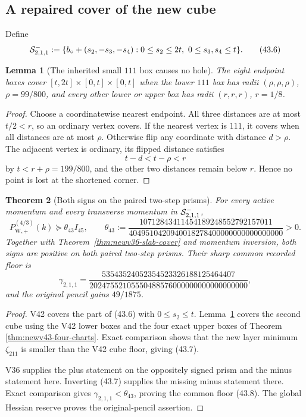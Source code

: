 \documentclass[11pt,oneside]{article}
\newtheorem{theorem}{Theorem}[section]
\newtheorem{lemma}[theorem]{Lemma}
\theoremstyle{definition}
\theoremstyle{remark}
\begin{document}
\subsection{A repaired cover of the new cube}

Define
\[
 {\cal S}_{2,1,1}^{-}:=
 \{b_\circ+(s_2,-s_3,-s_4):
       0\le s_2\le2t,\ 0\le s_3,s_4\le t\}.            \tag{43.6}
\]

\begin{lemma}[The inherited small \(111\) box causes no hole]
\label{lem:newv43-special-cover}
The eight endpoint boxes cover
\([t,2t]\times[0,t]\times[0,t]\) when the lower \(111\) box has
radii \((\rho,\rho,\rho)\), \(\rho=99/800\), and every other lower
or upper box has radii \((r,r,r)\), \(r=1/8\).
\end{lemma}

\begin{proof}
Choose a coordinatewise nearest endpoint.  All three distances are
at most \(t/2<r\), so an ordinary vertex covers.  If the nearest
vertex is \(111\), it covers when all distances are at most
\(\rho\).  Otherwise flip any coordinate with distance
\(d>\rho\).  The adjacent vertex is ordinary, its flipped distance
satisfies
\[
 t-d<t-\rho<r
\]
by \(t<r+\rho=199/800\), and the other two distances remain below
\(r\).  Hence no point is lost at the shortened corner.
\end{proof}

\begin{theorem}[Both signs on the paired two-step prisms]
\label{thm:newv43-paired-prisms}
For every active momentum and every transverse momentum in
\({\cal S}_{2,1,1}^{-}\),
\[
 P_{\mathrm W,+}^{(4/3)}(k)
 \succeq\theta_{43}I_{45},\qquad
 \theta_{43}:=
 \frac{10712843411454189248552792157011}
 {4049510420940018278400000000000000000}>0.            \tag{43.7}
\]
Together with Theorem~\ref{thm:newv36-slab-cover} and momentum
inversion, both signs are positive on both paired two-step prisms.
Their sharp common recorded floor is
\[
 \gamma_{2,1,1}
 =\frac{53543524052354523326188125464407}
 {20247552105550488576000000000000000000},             \tag{43.8}
\]
and the original pencil gains \(49/1875\).
\end{theorem}

\begin{proof}
V42 covers the part of (43.6) with \(0\le s_2\le t\).
Lemma~\ref{lem:newv43-special-cover} covers the second cube using
the V42 lower boxes and the four exact upper boxes of Theorem
\ref{thm:newv43-four-charts}.  Exact comparison shows that the new
layer minimum \(\zeta_{211}\) is smaller than the V42 cube floor,
giving (43.7).

V36 supplies the plus statement on the oppositely signed prism and
the minus statement here.  Inverting (43.7) supplies the missing
minus statement there.  Exact comparison gives
\(\gamma_{2,1,1}<\theta_{43}\), proving the common floor (43.8).
The global Hessian reserve proves the original-pencil assertion.
\end{proof}
\end{document}
